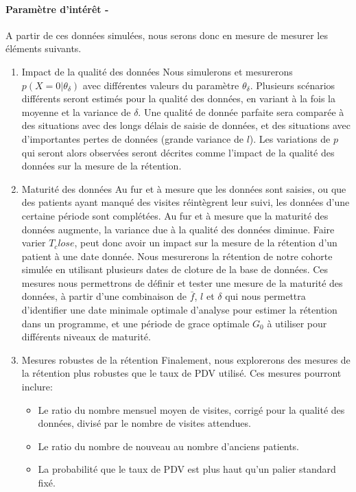 \documentclass[paper=a4, fontsize=11pt]{scrartcl}
\numberwithin{equation}{section}		%
\numberwithin{figure}{section}			%
\numberwithin{table}{section}				%
\begin{document}
\paragraph{Paramètre d'intérêt - }A partir de ces données simulées, nous serons donc en mesure de mesurer les éléments suivants.
\begin{enumerate}
\item{Impact de la qualité des données} Nous simulerons et mesurerons $ p(X = 0 | \theta_{\delta})$ avec différentes valeurs du paramètre $\theta_{\delta}$. Plusieurs scénarios différents seront estimés pour la qualité des données, en variant à la fois la moyenne et la variance de $\delta$. Une qualité de donnée parfaite sera comparée à des situations avec des longs délais de saisie de données, et des situations avec d'importantes pertes de données (grande variance de $l$). Les variations de $p$  qui seront alors observées seront décrites comme l'impact de la qualité des données sur la mesure de la rétention.

\item{Maturité des données} Au fur et à mesure que les données sont saisies, ou que des patients ayant manqué des visites réintègrent leur suivi, les données d'une certaine période sont complétées. Au fur et à mesure que la maturité des données augmente, la variance due à la qualité des données diminue. Faire varier $T_close$, peut donc avoir un impact sur la mesure de la rétention d'un patient à une date donnée. Nous mesurerons la rétention de notre cohorte simulée en utilisant plusieurs dates de cloture de la base de données. Ces mesures nous permettrons de définir et tester une mesure de la maturité des données, à partir d'une combinaison de  $\bar{f}$, $l$ et $\delta$ qui nous permettra d'identifier une date minimale optimale d'analyse pour estimer la rétention dans un programme, et une période de grace optimale $G_0$ à utiliser pour différents niveaux de maturité.

\item{Mesures robustes de la rétention} Finalement, nous explorerons des mesures de la rétention plus robustes que le taux de PDV utilisé. Ces mesures pourront inclure:
\begin{itemize}
	\item Le ratio du nombre mensuel moyen de visites, corrigé pour la qualité des données, divisé par le nombre de visites attendues.
	\item Le ratio du nombre de nouveau au nombre d'anciens patients.
	\item La probabilité que le taux de PDV est plus haut qu'un palier standard fixé.
\end{itemize}
\end{enumerate}
\end{document}
